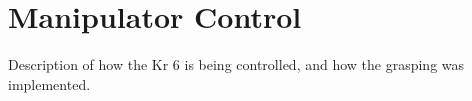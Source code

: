 \section{Manipulator Control \label{sec:manipulator_control_sec}}

Description of how the Kr 6 is being controlled, and how the grasping was implemented.
